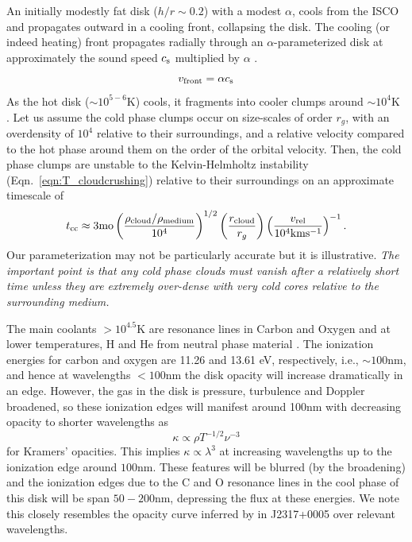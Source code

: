 \documentclass[a4paper,fleqn,usenatbib]{mnras}
\begin{document}
{An initially modestly fat disk ($h/r \sim 0.2$) with a modest $\alpha$,
cools from the ISCO and propagates outward in a cooling front,
collapsing the disk. The cooling (or indeed heating) front propagates
radially through an $\alpha$-parameterized disk at approximately the
sound speed $c_{\rm s}$ multiplied by $\alpha$ \citep[e.g., ][Equation
20]{Hameury2009}.
\begin{equation}
v_{\rm front} = \alpha  c_{\rm s} 
\end{equation}
As the hot disk ($\sim 10^{5-6}$K) cools, it
fragments into cooler clumps around $\sim 10^{4}$K \citep[see e.g.,
][]{McCourt2016}.  
Let us assume the cold phase clumps occur on size-scales of order
$r_g$, with an overdensity of $10^{4}$ relative to their surroundings,
and a relative velocity compared to the hot phase around them on the
order of the orbital velocity. Then, the cold phase clumps are
unstable to the Kelvin-Helmholtz instability
(Eqn.~\ref{eqn:T_cloudcrushing}) relative to their surroundings on an
approximate timescale of
\begin{equation}
t_{{\rm cc}} \approx 3{\rm mo} 
               \left( \frac{\rho_{\rm{cloud}}/\rho_{\rm{medium}}}{10^{4}}   \right)^{1/2}
               \left( \frac{r_{\rm cloud}}{r_{g}}\right) 
              \left( \frac{v_{\rm rel}}{10^{4}\rm{km s^{-1}}} \right)^{-1}.
\end{equation}
Our parameterization may not be particularly accurate but it is
illustrative. {\it The important point is that any cold phase clouds
must vanish after a relatively short time unless they are extremely
over-dense with very cold cores relative to the surrounding
medium.} 
}

The main coolants $>10^{4.5}$K are resonance lines
in Carbon and Oxygen and at lower temperatures, H and He from neutral
phase material \citep[see e.g., Fig. 18 in
][]{Sutherland_Dopita1993}. The ionization energies for carbon and
oxygen are 11.26 and 13.61 eV, respectively, i.e., $\sim 100$nm, and
hence at wavelengths $<100$nm the disk opacity will increase
dramatically in an edge.  However, the gas in the disk is pressure,
turbulence and Doppler broadened, so these ionization edges will
manifest around 100nm with decreasing opacity to shorter wavelengths
as
\begin{equation}
  \kappa \propto \rho T^{-1/2} \nu^{-3}
\end{equation}
for Kramers' opacities. This implies $\kappa \propto \lambda^{3}$
at increasing wavelengths up to the ionization edge around $100$nm.
These features will be blurred (by the broadening) and the ionization 
edges due to the C and O resonance lines in the cool phase of this
disk will be span $50-200$nm, depressing the flux at these energies. 
We note this closely resembles the opacity curve inferred by \citet{Guo2016} 
in J2317+0005 over relevant wavelengths.
\end{document}
